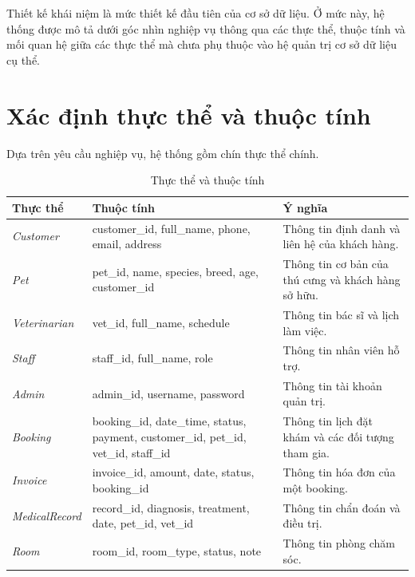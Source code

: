 Thiết kế khái niệm là mức thiết kế đầu tiên của cơ sở dữ liệu. Ở mức này, hệ thống được mô tả dưới góc nhìn nghiệp vụ thông qua các thực thể, thuộc tính và mối quan hệ giữa các thực thể mà chưa phụ thuộc vào hệ quản trị cơ sở dữ liệu cụ thể.

\section{Xác định thực thể và thuộc tính}

Dựa trên yêu cầu nghiệp vụ, hệ thống gồm chín thực thể chính.

\begin{table}[htbp]
    \centering
    \caption{Thực thể và thuộc tính}
    \label{tab:entity_attributes}
    \begin{tabularx}{\textwidth}{|p{2.8cm}|p{5.5cm}|X|}
        \hline
        \textbf{Thực thể} &
        \textbf{Thuộc tính} &
        \textbf{Ý nghĩa} \\ \hline

        \textit{Customer} &
        customer\_id, full\_name, phone, email, address &
        Thông tin định danh và liên hệ của khách hàng. \\ \hline

        \textit{Pet} &
        pet\_id, name, species, breed, age, customer\_id &
        Thông tin cơ bản của thú cưng và khách hàng sở hữu. \\ \hline

        \textit{Veterinarian} &
        vet\_id, full\_name, schedule &
        Thông tin bác sĩ và lịch làm việc. \\ \hline

        \textit{Staff} &
        staff\_id, full\_name, role &
        Thông tin nhân viên hỗ trợ. \\ \hline

        \textit{Admin} &
        admin\_id, username, password &
        Thông tin tài khoản quản trị. \\ \hline

        \textit{Booking} &
        booking\_id, date\_time, status, payment, customer\_id, pet\_id, vet\_id, staff\_id &
        Thông tin lịch đặt khám và các đối tượng tham gia. \\ \hline

        \textit{Invoice} &
        invoice\_id, amount, date, status, booking\_id &
        Thông tin hóa đơn của một booking. \\ \hline

        \textit{MedicalRecord} &
        record\_id, diagnosis, treatment, date, pet\_id, vet\_id &
        Thông tin chẩn đoán và điều trị. \\ \hline

        \textit{Room} &
        room\_id, room\_type, status, note &
        Thông tin phòng chăm sóc. \\ \hline
    \end{tabularx}
\end{table}

